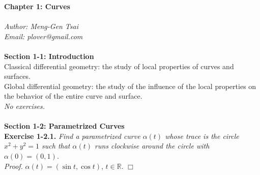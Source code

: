 \documentclass{article}
\begin{document}
\textbf{\Large Chapter 1: Curves} \\\\



\emph{Author: Meng-Gen Tsai} \\
\emph{Email: plover@gmail.com} \\\\









\textbf{\large Section 1-1: Introduction} \\

Classical differential geometry: the study of local properties of
curves and surfaces. \\

Global differential geometry: the study of the influence of the local properties
on the behavior of the entire curve and surface. \\

\emph{No exercises.} \\\\






\textbf{\large Section 1-2: Parametrized Curves} \\

\textbf{Exercise 1-2.1.}
\emph{Find a parametrized curve $\alpha(t)$ whose trace is the circle
$x^2 + y^2 = 1$ such that $\alpha(t)$ runs clockwise around the circle
with $\alpha(0) = (0,1)$.} \\

\emph{Proof.}
$\alpha(t) = (\sin t, \cos t)$, $t \in \mathbb{R}$.
$\Box$ \\\\



\end{document}
